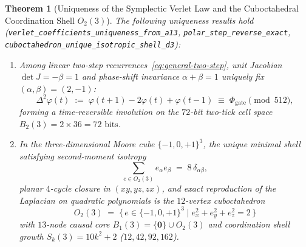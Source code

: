\documentclass[11pt,a4paper]{article}
\theoremstyle{plain}
\newtheorem{theorem}{Theorem}[section]
\theoremstyle{definition}
\begin{document}
\begin{theorem}[Uniqueness of the Symplectic Verlet Law and the Cuboctahedral Coordination Shell $O_2(3)$]
\label{thm:d3-verlet-cuboct}
The following uniqueness results hold (\texttt{verlet\_coefficients\_uniqueness\_from\_a13}, \texttt{polar\_step\_reverse\_exact}, \texttt{cuboctahedron\_unique\_isotropic\_shell\_d3}):
\begin{enumerate}[label=\textbf{(\arabic*)},leftmargin=*]
\item Among linear two-step recurrences~\eqref{eq:general-two-step}, unit Jacobian $\det J = -\beta = 1$ and phase-shift invariance $\alpha + \beta = 1$ uniquely fix $(\alpha, \beta) = (2, -1)$:
  \begin{equation}
    \label{eq:verlet-law}
    \Delta^2\varphi(t) \;:=\; \varphi(t+1) - 2\varphi(t) + \varphi(t-1) \;\equiv\; \Phi_{\mathrm{gate}} \pmod{512},
  \end{equation}
  forming a time-reversible involution on the $72$-bit two-tick cell space $B_2(3) = 2\times 36 = 72\text{ bits}$.
\item In the three-dimensional Moore cube $\{-1,0,+1\}^3$, the unique minimal shell satisfying second-moment isotropy
  \begin{equation}
    \label{eq:o2-second-moment}
    \sum_{e\in O_2(3)} e_\alpha e_\beta \;=\; 8\,\delta_{\alpha\beta},
  \end{equation}
  planar $4$-cycle closure in $(xy,yz,zx)$, and exact reproduction of the Laplacian on quadratic polynomials is the $12$-vertex cuboctahedron
  \begin{equation}
    \label{eq:o2-def}
    O_2(3) \;=\; \bigl\{\,e\in\{-1,0,+1\}^3 \;\big|\; e_x^2 + e_y^2 + e_z^2 = 2\,\bigr\}
  \end{equation}
  with $13$-node causal core $B_1(3) = \{\mathbf{0}\}\cup O_2(3)$ and coordination shell growth $S_k(3) = 10k^2 + 2$ ($12, 42, 92, 162$).
\end{enumerate}
\end{theorem}
\end{document}
